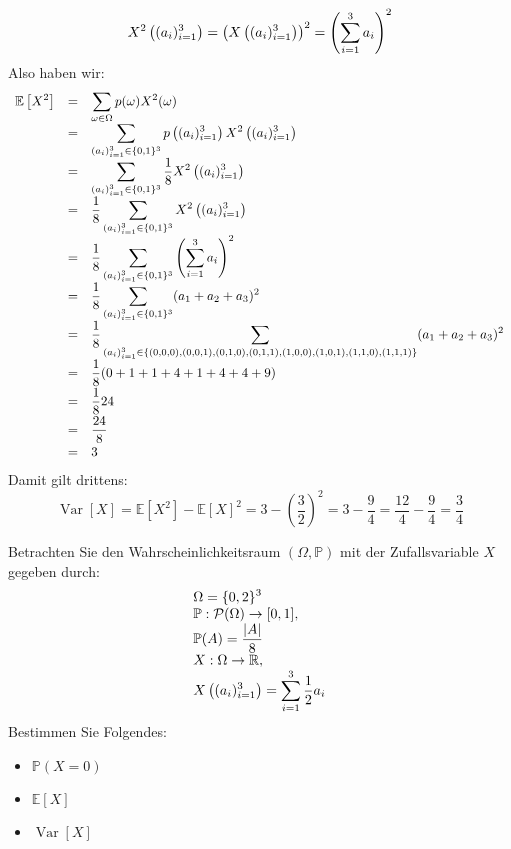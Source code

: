 \documentclass{article}
\begin{document}
\begin{solution}
\[\begin{array}{>{\displaystyle}l}
X^2 \left( (a_i)_{i = 1}^3 \right) = \left( X \left( (a_i)_{i = 1}^3 \right) \right)^2 = \left( \sum_{i = 1}^3 a_i \right)^2 \\
\end{array}
\]
Also haben wir:
\[
\begin{array}{>{\displaystyle}r>{\displaystyle}c>{\displaystyle}l}
\mathbb{E} \left[ X^2 \right] & = & \sum_{\omega \in \Omega} p(\omega) X^2 (\omega) \\
& = & \sum_{(a_i)_{i = 1}^3 \in \{0, 1\}^3} p \left( (a_i)_{i = 1}^3 \right) X^2 \left( (a_i)_{i = 1}^3 \right) \\
& = & \sum_{(a_i)_{i = 1}^3 \in \{0, 1\}^3} \frac{1}{8} X^2 \left( (a_i)_{i = 1}^3 \right) \\
& = & \frac{1}{8} \sum_{(a_i)_{i = 1}^3 \in \{0, 1\}^3} X^2 \left( (a_i)_{i = 1}^3 \right) \\
& = & \frac{1}{8} \sum_{(a_i)_{i = 1}^3 \in \{0, 1\}^3} \left( \sum_{i = 1}^3 a_i \right)^2 \\
& = & \frac{1}{8} \sum_{(a_i)_{i = 1}^3 \in \{0, 1\}^3} (a_1 + a_2 + a_3)^2 \\
& = & \frac{1}{8} \sum_{(a_i)_{i = 1}^3 \in \{(0, 0, 0), (0, 0, 1), (0, 1, 0), (0, 1, 1), (1, 0, 0), (1, 0, 1), (1, 1, 0), (1, 1, 1)\}} (a_1 + a_2 + a_3)^2 \\
& = & \frac{1}{8} (0 + 1 + 1 + 4 + 1 + 4 + 4 + 9) \\[5pt]
& = & \frac{1}{8} 24 \\[5pt]
& = & \frac{24}{8} \\[5pt]
& = & 3 \\
\end{array}
\]
Damit gilt drittens:
\[
\operatorname{Var}[X] = \mathbb{E} \left[ X^2 \right] - \mathbb{E}[X]^2 = 3 - \left( \frac{3}{2} \right)^2 = 3 - \frac{9}{4} = \frac{12}{4} - \frac{9}{4} = \frac{3}{4}
\]
\end{solution}

\newpage

\begin{problem}
Betrachten Sie den Wahrscheinlichkeitsraum $(\Omega, \mathbb{P})$ mit der Zufallsvariable $X$ gegeben durch:
\[
\begin{array}{>{\displaystyle}l}
\Omega = \{0, 2\}^3 \\
\mathbb{P}: \mathcal{P}(\Omega) \to [0, 1], \\
\mathbb{P}(A) = \frac{|A|}{8} \\
X: \Omega \to \mathbb{R}, \\
X \left( (a_i)_{i = 1}^3 \right) = \sum_{i = 1}^3 \frac{1}{2} a_i
\end{array}
\]
Bestimmen Sie Folgendes:
\begin{itemize}
\item $\mathbb{P}(X = 0)$
\item $\mathbb{E}[X]$
\item $\operatorname{Var}[X]$
\end{itemize}
\end{problem}
\end{document}
